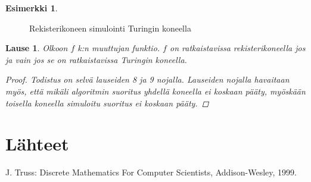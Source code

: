 \documentclass[a4paper, 12pt]{article}
\theoremstyle{definition}
\newtheorem{example}[mydef]{Esimerkki}
\theoremstyle{plain}
\newtheorem{teor}[mydef]{Lause}
\begin{document}
\begin{example}
\begin{figure}[tb]
\caption{Rekisterikoneen simulointi Turingin koneella}
\end{figure}

\end{example}

\begin{teor}
Olkoon $f$ k:n muuttujan funktio. $f$ on ratkaistavissa rekisterikoneella jos ja vain jos se on ratkaistavissa Turingin koneella.
\begin{proof}
Todistus on selvä lauseiden 8 ja 9 nojalla. Lauseiden nojalla havaitaan myös, että mikäli algoritmin suoritus yhdellä koneella ei koskaan pääty, myöskään toisella koneella simuloitu suoritus ei koskaan pääty.
\end{proof}
\end{teor}

\appendix

\section{Lähteet}
J. Truss: Discrete Mathematics For Computer Scientists, Addison-Wesley, 1999.
\end{document}
